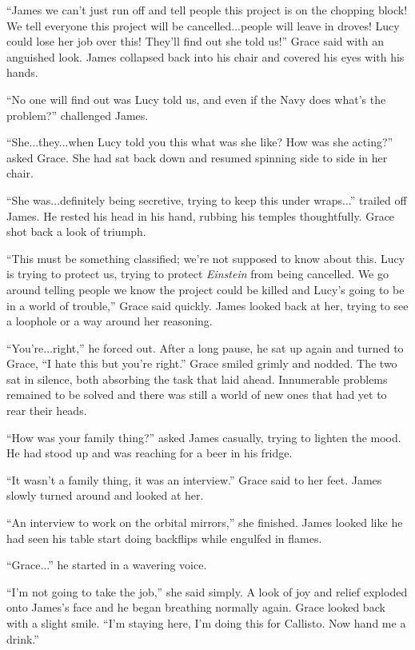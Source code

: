 \documentclass[12pt]{article} %
\begin{document}
``James we can't just run off and tell people this project is on the chopping block! We tell everyone this project will be cancelled...people will leave in droves! Lucy could lose her job over this! They'll find out she told us!'' Grace said with an anguished look. James collapsed back into his chair and covered his eyes with his hands. 

``No one will find out was Lucy told us, and even if the Navy does what's the problem?'' challenged James.

``She...they...when Lucy told you this what was she like? How was she acting?'' asked Grace. She had sat back down and resumed spinning side to side in her chair.

``She was...definitely being secretive, trying to keep this under wraps...'' trailed off James. He rested his head in his hand, rubbing his temples thoughtfully. Grace shot back a look of triumph.

``This must be something classified; we're not supposed to know about this. Lucy is trying to protect us, trying to protect \textit{Einstein} from being cancelled. We go around telling people we know the project could be killed and Lucy's going to be in a world of trouble,'' Grace said quickly. James looked back at her, trying to see a loophole or a way around her reasoning.

``You're...right,'' he forced out. After a long pause, he sat up again and turned to Grace, ``I hate this but you're right.'' Grace smiled grimly and nodded. The two sat in silence, both absorbing the task that laid ahead. Innumerable problems remained to be solved and there was still a world of new ones that had yet to rear their heads.

``How was your family thing?'' asked James casually, trying to lighten the mood. He had stood up and was reaching for a beer in his fridge.

``It wasn't a family thing, it was an interview.'' Grace said to her feet. James slowly turned around and looked at her.

``An interview to work on the orbital mirrors,'' she finished. James looked like he had seen his table start doing backflips while engulfed in flames.

``Grace...'' he started in a wavering voice.

``I'm not going to take the job,'' she said simply. A look of joy and relief exploded onto James's face and he began breathing normally again. Grace looked back with a slight smile. ``I'm staying here, I'm doing this for Callisto. Now hand me a drink.''
\end{document}
